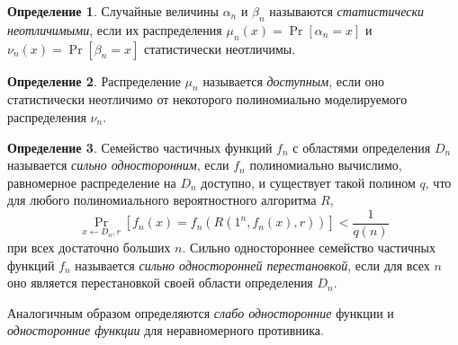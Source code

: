 \documentclass[12pt]{article}
\theoremstyle{definition}
\newtheorem{definition}{Определение}[section]
\theoremstyle{plain}
\theoremstyle{remark}
\begin{document}
\begin{definition}
Случайные величины $\alpha_n$ и $\beta_n$ называются \emph{статистически
неотличимыми}, если их распределения $\mu_n(x) = \Pr[\alpha_n = x]$
и $\nu_n(x) = \Pr[\beta_n = x]$ статистически неотличимы.
\end{definition}

\begin{definition}
Распределение $\mu_n$ называется \emph{доступным}, если оно статистически
неотличимо от некоторого полиномиально моделируемого распределения $\nu_n$.
\end{definition}

\begin{definition}
Семейство частичных функций $f_n$ с областями определения $D_n$ называется 
\emph{сильно односторонним}, если $f_n$ полиномиально вычислимо, равномерное
распределение на $D_n$ доступно, и существует такой полином $q$, что для любого
полиномиального вероятностного алгоритма $R$,
$$\Pr_{x\gets D_n,r}[f_n(x) = f_n(R(1^n, f_n(x), r))] < \frac{1}{q(n)}$$
при всех достаточно больших $n$. Сильно одностороннее семейство частичных функций
$f_n$ называется \emph{сильно односторонней перестановкой}, 
если для всех $n$ оно является перестановкой своей области определения $D_n$.
\end{definition}
Аналогичным образом определяются \emph{слабо односторонние} функции и
\emph{односторонние функции} для неравномерного противника.
\end{document}
